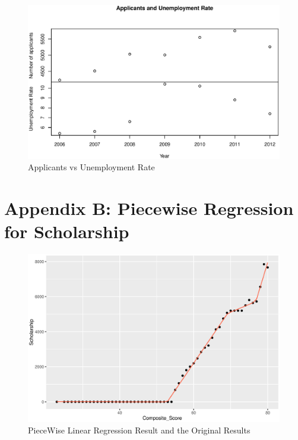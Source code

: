 \documentclass[12pt,english]{report}
\begin{document}
\begin{figure}[ht]
   \centering
 \includegraphics[scale=0.65]{pic/applicant_unmployment.eps}
 \caption{Applicants vs Unemployment Rate}
\end{figure}


\chapter{Appendix B: Piecewise Regression for Scholarship}  \label{AppB}

\begin{figure}[ht]
   \centering
 \includegraphics[scale=0.75]{pic/PieceWiseRegression.eps}
 \caption{PieceWise Linear Regression Result and the Original Results}
 \label{PieceWisePolicy}
\end{figure}
\end{document}
